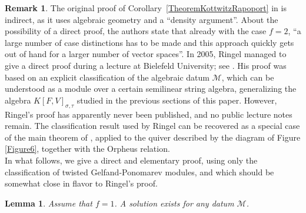 \documentclass[12pt]{amsart}
\newtheorem{lemma}[theorem]{Lemma}
\theoremstyle{definition}
\newtheorem{remark}[theorem]{Remark}
\newcommand{\<}{\langle}   %
\renewcommand{\>}{\rangle} %
\begin{document}
\begin{remark}\label{RemarkTheorem6.1}
    The original proof of Corollary~\ref{TheoremKottwitzRapoport} in \cite{kottwitzrapoport:2003} is indirect, as it uses algebraic geometry and a ``density argument''. About the possibility of a direct proof, the authors state that already with the case $f=2$, ``a large number of case distinctions has to be made and this approach quickly gets out of hand for a larger number of vector spaces''. In 2005, Ringel managed to give a direct proof during a lecture at Bielefeld University; see \cite{ringellecture:2005}. His proof was based on an explicit classification of the algebraic datum $\mathcal M$, which can be understood as a module over a certain semilinear string algebra, generalizing the algebra $K[F,V]_{\sigma,\tau}$ studied in the previous sections of this paper. However, Ringel's proof has apparently never been published, and no public lecture notes remain. The classification result used by Ringel can be recovered as a special case of the main theorem of \cite{clannishalgebras:2024}, applied to the quiver described by the diagram of Figure \ref{Figure6}, together with the Orpheus relation. \\
    In what follows, we give a direct and elementary proof, using only the classification of twisted Gelfand-Ponomarev modules, and which should be somewhat close in flavor to Ringel's proof.
\end{remark}

\begin{lemma}\label{LemmaCasef=1}
    Assume that $f=1$. A solution exists for any datum $\mathcal M$.
\end{lemma}
\end{document}
